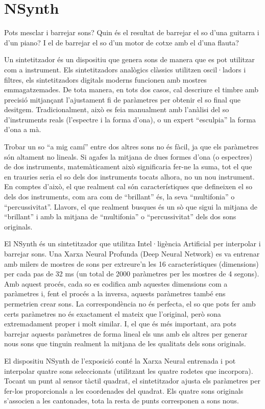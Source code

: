 \section{NSynth}
Pots mesclar i barrejar sons? Quin és el resultat de barrejar el so d'una guitarra i d'un piano? I el de barrejar el so d'un motor de cotxe amb el d'una flauta?

Un sintetitzador és un dispositiu que genera sons de manera que es pot utilitzar com a instrument. Els sintetitzadors analògics clàssics utilitzen oscil·ladors i filtres, els sintetitzadors digitals moderns funcionen amb mostres emmagatzemades. De tota manera, en tots dos casos, cal descriure el timbre amb precisió mitjançant l'ajustament fi de paràmetres per obtenir el so final que desitgem. Tradicionalment, això es feia manualment amb l'anàlisi del so d'instruments reals (l'espectre i la forma d'ona), o un expert ``esculpia'' la forma d'ona a mà.

Trobar un so ``a mig camí'' entre dos altres sons no és fàcil, ja que els paràmetres són altament no lineals. Si agafes la mitjana de dues formes d'ona (o espectres) de dos instruments, matemàticament això significaria fer-ne la suma, tot el que en trauries seria el so dels dos instruments tocats alhora, no un nou instrument. En comptes d'això, el que realment cal són característiques que defineixen el so dels dos instruments, com ara com de ``brillant'' és, la seva  ``multifonia'' o ``percussivitat''. Llavors, el que realment busques és un sò que sigui la mitjana de ``brillant'' i amb la mitjana de ``multifonia'' o ``percussivitat'' dels dos sons originals.

El NSynth és un sintetitzador que utilitza Intel·ligència Artificial per interpolar i barrejar sons. Una Xarxa Neural Profunda (Deep Neural Network) es va entrenar amb milers de mostres de sons per extreure'n les 16 característiques (dimensions) per cada pas de 32 ms (un total de 2000 paràmetres per les mostres de 4 segons). Amb aquest procés, cada so es codifica amb aquestes dimensions com a paràmetres i, fent el procés a la inversa, aquests paràmetres també ens permetrien crear sons. La correspondència no és perfecta, el so que pots fer amb certs paràmetres no és exactament el mateix que l'original, però sona extremadament proper i molt similar. I, el que és més important, ara pots barrejar aquests paràmetres de forma lineal els uns amb els altres per generar nous sons que tinguin realment la mitjana de les qualitats dels sons originals.

El dispositiu NSynth de l'exposició conté la Xarxa Neural entrenada i pot interpolar quatre sons seleccionats (utilitzant les quatre rodetes que incorpora). Tocant un punt al sensor tàctil quadrat, el sintetitzador ajusta els paràmetres per fer-los proporcionals a les coordenades del quadrat.  Els quatre sons originals s'associen a les cantonades, tota la resta de punts corresponen a sons nous.

